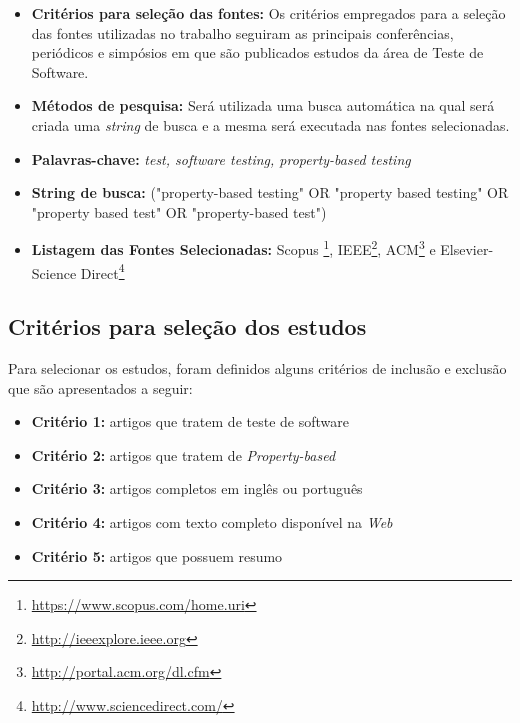 \begin{itemize}
    \item \textbf{Critérios para seleção das fontes:} Os critérios empregados para a seleção das fontes utilizadas no trabalho seguiram as principais conferências, periódicos e simpósios em que são publicados estudos da área de Teste de Software.
    
    
    \item \textbf{Métodos de pesquisa:} Será utilizada uma busca automática na qual será criada uma \textit{string} de busca e a mesma será executada nas fontes selecionadas.
    
    
    \item \textbf{Palavras-chave:} \textit{test, software testing, property-based testing}
    
    
    \item \textbf{String de busca:} ("property-based testing" OR "property based testing" OR "property based test" OR "property-based test") 
    
    
    \item \textbf{Listagem das Fontes Selecionadas:} Scopus \footnote{\url{https://www.scopus.com/home.uri}}, IEEE\footnote{\url{http://ieeexplore.ieee.org}}, ACM\footnote{\url{http://portal.acm.org/dl.cfm}} e Elsevier-Science Direct\footnote{\url{http://www.sciencedirect.com/}}
\end{itemize}

\subsection{Critérios para seleção dos estudos}

Para selecionar os estudos, foram definidos alguns critérios de inclusão e exclusão que são apresentados a seguir:

\begin{itemize}
    \item \textbf{Critério 1:} artigos que tratem de teste de software
    
    
    
    \item \textbf{Critério 2:} artigos que tratem de \textit{Property-based}
    
    
    \item \textbf{Critério 3:} artigos completos em inglês ou português
    
    
    \item \textbf{Critério 4:} artigos com texto completo disponível na \textit{Web}
    
    
    \item \textbf{Critério 5:} artigos que possuem resumo
\end{itemize}


